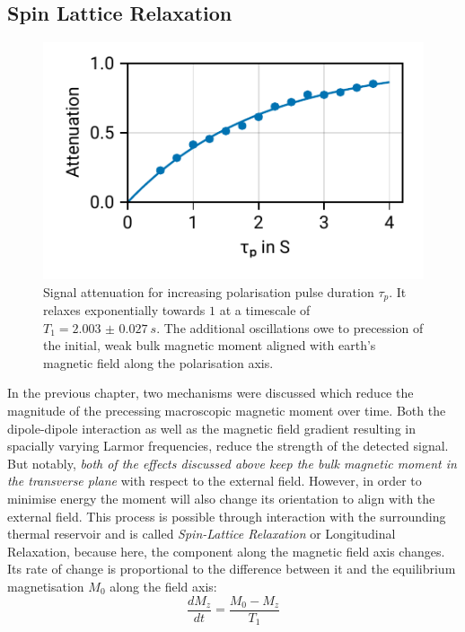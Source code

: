 \documentclass[
    parskip=half, 
    twoside=false,
    twocolumn=true,
    fontsize=11pt,
]{scrarticle}
\begin{document}
\subsection{Spin Lattice Relaxation}
\begin{figure}
    \centering
    \label{fig:spin-lattice}
    \includegraphics{figures/03 T1.pdf}
    \caption{Signal attenuation for increasing polarisation pulse duration $\tau_p$. It relaxes exponentially towards $1$ at a timescale of $T_1 = \SI{2.003(27)}{s}$. The additional oscillations owe to precession of the initial, weak bulk magnetic moment aligned with earth's magnetic field along the polarisation axis.}
\end{figure}
In the previous chapter, two mechanisms were discussed which reduce the magnitude of the precessing macroscopic magnetic moment over time. Both the dipole-dipole interaction as well as the magnetic field gradient resulting in spacially varying Larmor frequencies, reduce the strength of the detected signal. But notably, \textit{both of the effects discussed above keep the bulk magnetic moment in the transverse plane} with respect to the external field. However, in order to minimise energy the moment will also change its orientation to align with the external field. This process is possible through interaction with the surrounding thermal reservoir and is called \textit{Spin-Lattice Relaxation} or Longitudinal Relaxation, because here, the component along the magnetic field axis changes. Its rate of change is proportional to the difference between it and the equilibrium magnetisation $M_0$ along the field axis:
\begin{equation}
 \frac{dM_z}{dt} = \frac{M_0 - M_z}{T_1}
\end{equation}
\end{document}
